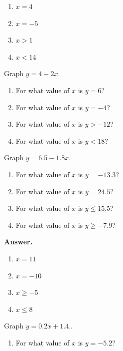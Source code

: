 \documentclass[10pt,]{book}
\theoremstyle{plain}
\theoremstyle{definition}
\theoremstyle{definition}
\theoremstyle{definition}
\theoremstyle{definition}
\numberwithin{equation}{part}
\newcommand{\lt}{<}
\newcommand{\gt}{>}
\begin{document}
\begin{exerciselist}
\begin{exercisegroup}
\begin{multicols}{4}
\begin{enumerate}[label=*\alph**]
\item\hypertarget{li-843}{}\(x = 4\)%
\item\hypertarget{li-844}{}\(x = -5\)%
\item\hypertarget{li-845}{}\(x\gt 1\)%
\item\hypertarget{li-846}{}\(x\lt 14 \)%
\end{enumerate}
\end{multicols}
%
\exercise[42.]\hypertarget{exercise-199}{}Graph \(y = 4 - 2x\). \leavevmode%
\begin{enumerate}[label=*\alph**]
\item\hypertarget{li-847}{}For what value of \(x\) is \(y = 6\)?%
\item\hypertarget{li-848}{}For what value of \(x\) is \(y = -4\)?%
\item\hypertarget{li-849}{}For what value of \(x\) is \(y\gt -12 \)?%
\item\hypertarget{li-850}{}For what value of \(x\) is \(y\lt 18\)?%
\end{enumerate}
%
\exercise[43.]\hypertarget{exercise-200}{}Graph \(y = 6.5 - 1.8x\). \leavevmode%
\begin{enumerate}[label=*\alph**]
\item\hypertarget{li-851}{}For what value of \(x\) is \(y = -13.3\)?%
\item\hypertarget{li-852}{}For what value of \(x\) is \(y = 24.5\)?%
\item\hypertarget{li-853}{}For what value of \(x\) is \(y\le 15.5 \)?%
\item\hypertarget{li-854}{}For what value of \(x\) is \(y\ge -7.9\)?%
\end{enumerate}
%
\par\smallskip
\noindent\textbf{Answer.}\hypertarget{answer-114}{}\quad
\leavevmode%
\begin{multicols}{4}
\begin{enumerate}[label=*\alph**]
\item\hypertarget{li-855}{}\(x = 11\)%
\item\hypertarget{li-856}{}\(x = -10\)%
\item\hypertarget{li-857}{}\(x\ge -5\)%
\item\hypertarget{li-858}{}\(x\le 8 \)%
\end{enumerate}
\end{multicols}
%
\exercise[44.]\hypertarget{exercise-201}{}Graph \(y = 0.2x + 1.4.\). \leavevmode%
\begin{enumerate}[label=*\alph**]
\item\hypertarget{li-859}{}For what value of \(x\) is \(y = -5.2\)?%

\end{enumerate}
\end{exercisegroup}
\end{exerciselist}
\end{document}
